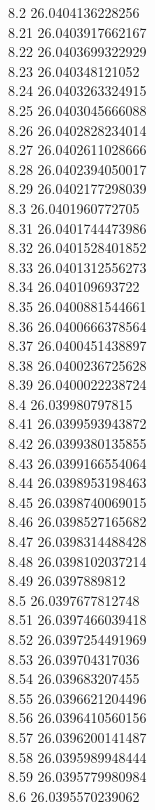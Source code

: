 {8.2	26.0404136228256\\
8.21	26.0403917662167\\
8.22	26.0403699322929\\
8.23	26.040348121052\\
8.24	26.0403263324915\\
8.25	26.0403045666088\\
8.26	26.0402828234014\\
8.27	26.0402611028666\\
8.28	26.0402394050017\\
8.29	26.0402177298039\\
8.3	26.0401960772705\\
8.31	26.0401744473986\\
8.32	26.0401528401852\\
8.33	26.0401312556273\\
8.34	26.040109693722\\
8.35	26.0400881544661\\
8.36	26.0400666378564\\
8.37	26.0400451438897\\
8.38	26.0400236725628\\
8.39	26.0400022238724\\
8.4	26.039980797815\\
8.41	26.0399593943872\\
8.42	26.0399380135855\\
8.43	26.0399166554064\\
8.44	26.0398953198463\\
8.45	26.0398740069015\\
8.46	26.0398527165682\\
8.47	26.0398314488428\\
8.48	26.0398102037214\\
8.49	26.0397889812\\
8.5	26.0397677812748\\
8.51	26.0397466039418\\
8.52	26.0397254491969\\
8.53	26.039704317036\\
8.54	26.039683207455\\
8.55	26.0396621204496\\
8.56	26.0396410560156\\
8.57	26.0396200141487\\
8.58	26.0395989948444\\
8.59	26.0395779980984\\
8.6	26.0395570239062\\
}
